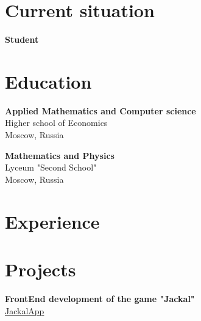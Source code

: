 \documentclass[a4paper,10pt]{article}
\begin{document}
\begin{adjustbox}{valign=t}
\begin{minipage}{0.6\textwidth}
\section*{Current situation}
\begin{description}
\raggedright
\item[\normalfont \textcolor{ColorOne}{2020-now}] \textbf{Student}\\ \medskip

\end{description}

\section*{Education}
	\begin{description}
	\raggedright
	\item [\normalfont \textcolor{ColorOne}{2020-now}] \textbf{Applied Mathematics and Computer science}\\
	Higher school of Economics\\
	Moscow, Russia

	\item [\normalfont \textcolor{ColorOne}{2015-2020}] \textbf{Mathematics and Physics}\\
	Lyceum "Second School"\\
	Moscow, Russia
\end{description}

\section*{Experience}
\begin{description}
\raggedright
\item[\normalfont \textcolor{ColorOne}{No experience!}] 

\end{description}

\section*{Projects}
\begin{description}
	\raggedright
	\item [\normalfont \textcolor{ColorOne}{2021}] \textbf{FrontEnd development of the game "Jackal"}\\
	\href{https://github.com/MikhailSazonov/Jackal_web_app/tree/main/Web_Jackal_v_0.228}{\github JackalApp}
\end{description}


\end{minipage}
\end{adjustbox}
\end{document}
